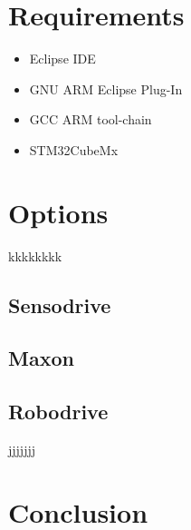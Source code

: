 \documentclass[a4paper]{article}
\title{\bf \maintitle\\
  \vspace{1cm}
  {\large
    \subtitle%
  }
}
\author{Nikolas Schroeder\\
  Institute for Systems Theory and Automatic Control\\
  \texttt{lrt86824@stud.uni-stuttgart.de}%
}
\date{\today}
\begin{document}
\maketitle

\hrulefill
\begin{abstract}
This paper gives an overview on how to program the STM-Discovery board with STM32Cube, Eclipse and a GNU Compiler. Also it deals with the inclusion of C/C++ code which was generated from Simulink models such as the DataAcquire.slx model. 
\end{abstract}

\hrulefill

\pagebreak

\section{Requirements}

\begin{itemize}
\item Eclipse IDE
\item GNU ARM Eclipse Plug-In
\item GCC ARM tool-chain
\item STM32CubeMx
\end{itemize}
 

{\small


}


\section{Options}

kkkkkkkk
\subsection{Sensodrive}

\subsection{Maxon}

\subsection{Robodrive}

jjjjjjj

{\small


}


\section{Conclusion}

{\small


}
\end{document}
